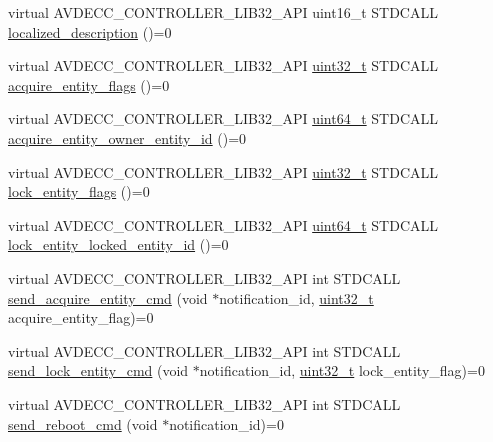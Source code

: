 \begin{DoxyCompactItemize}
\item 
virtual A\+V\+D\+E\+C\+C\+\_\+\+C\+O\+N\+T\+R\+O\+L\+L\+E\+R\+\_\+\+L\+I\+B32\+\_\+\+A\+PI uint16\+\_\+t S\+T\+D\+C\+A\+LL \hyperlink{classavdecc__lib_1_1descriptor__base_a1fb9de45567df344090a1407aa6b775f}{localized\+\_\+description} ()=0
\item 
virtual A\+V\+D\+E\+C\+C\+\_\+\+C\+O\+N\+T\+R\+O\+L\+L\+E\+R\+\_\+\+L\+I\+B32\+\_\+\+A\+PI \hyperlink{parse_8c_a6eb1e68cc391dd753bc8ce896dbb8315}{uint32\+\_\+t} S\+T\+D\+C\+A\+LL \hyperlink{classavdecc__lib_1_1descriptor__base_a42f2a796375edd05c8d29856c018042d}{acquire\+\_\+entity\+\_\+flags} ()=0
\item 
virtual A\+V\+D\+E\+C\+C\+\_\+\+C\+O\+N\+T\+R\+O\+L\+L\+E\+R\+\_\+\+L\+I\+B32\+\_\+\+A\+PI \hyperlink{parse_8c_aec6fcb673ff035718c238c8c9d544c47}{uint64\+\_\+t} S\+T\+D\+C\+A\+LL \hyperlink{classavdecc__lib_1_1descriptor__base_a6480d803970d505ce7a9b429a6eb71bd}{acquire\+\_\+entity\+\_\+owner\+\_\+entity\+\_\+id} ()=0
\item 
virtual A\+V\+D\+E\+C\+C\+\_\+\+C\+O\+N\+T\+R\+O\+L\+L\+E\+R\+\_\+\+L\+I\+B32\+\_\+\+A\+PI \hyperlink{parse_8c_a6eb1e68cc391dd753bc8ce896dbb8315}{uint32\+\_\+t} S\+T\+D\+C\+A\+LL \hyperlink{classavdecc__lib_1_1descriptor__base_a757e66272bba4c52cefa914df8c60bb5}{lock\+\_\+entity\+\_\+flags} ()=0
\item 
virtual A\+V\+D\+E\+C\+C\+\_\+\+C\+O\+N\+T\+R\+O\+L\+L\+E\+R\+\_\+\+L\+I\+B32\+\_\+\+A\+PI \hyperlink{parse_8c_aec6fcb673ff035718c238c8c9d544c47}{uint64\+\_\+t} S\+T\+D\+C\+A\+LL \hyperlink{classavdecc__lib_1_1descriptor__base_a052b47529d0e60ca87894159fcb65e14}{lock\+\_\+entity\+\_\+locked\+\_\+entity\+\_\+id} ()=0
\item 
virtual A\+V\+D\+E\+C\+C\+\_\+\+C\+O\+N\+T\+R\+O\+L\+L\+E\+R\+\_\+\+L\+I\+B32\+\_\+\+A\+PI int S\+T\+D\+C\+A\+LL \hyperlink{classavdecc__lib_1_1descriptor__base_adfd0cf2a51bff7d762b0efc743480c48}{send\+\_\+acquire\+\_\+entity\+\_\+cmd} (void $\ast$notification\+\_\+id, \hyperlink{parse_8c_a6eb1e68cc391dd753bc8ce896dbb8315}{uint32\+\_\+t} acquire\+\_\+entity\+\_\+flag)=0
\item 
virtual A\+V\+D\+E\+C\+C\+\_\+\+C\+O\+N\+T\+R\+O\+L\+L\+E\+R\+\_\+\+L\+I\+B32\+\_\+\+A\+PI int S\+T\+D\+C\+A\+LL \hyperlink{classavdecc__lib_1_1descriptor__base_a1ac1f5c700f4eebd37b7c45498b36bbc}{send\+\_\+lock\+\_\+entity\+\_\+cmd} (void $\ast$notification\+\_\+id, \hyperlink{parse_8c_a6eb1e68cc391dd753bc8ce896dbb8315}{uint32\+\_\+t} lock\+\_\+entity\+\_\+flag)=0
\item 
virtual A\+V\+D\+E\+C\+C\+\_\+\+C\+O\+N\+T\+R\+O\+L\+L\+E\+R\+\_\+\+L\+I\+B32\+\_\+\+A\+PI int S\+T\+D\+C\+A\+LL \hyperlink{classavdecc__lib_1_1descriptor__base_a1618412a9b3d57a12044030b31cfd5a3}{send\+\_\+reboot\+\_\+cmd} (void $\ast$notification\+\_\+id)=0

\end{DoxyCompactItemize}
